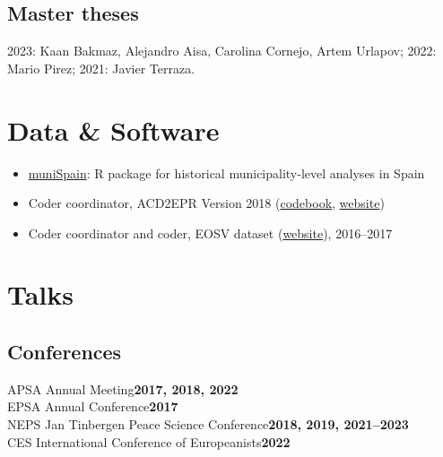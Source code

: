 \documentclass[a4paper, 12pt]{article}
\begin{document}
\subsection*{Master theses}

2023: Kaan Bakmaz, Alejandro Aisa, Carolina Cornejo, Artem Urlapov;
2022: Mario Pirez;
2021: Javier Terraza.

\section*{Data \& Software}

\begin{itemize}[leftmargin=*, nolistsep]
  \item \href{https://github.com/franvillamil/muniSpain}{muniSpain}: R package for historical municipality-level analyses in Spain
	\item Coder coordinator, ACD2EPR Version 2018 (\href{https://icr.ethz.ch/data/epr/acd2epr/ACD2EPR-2018_Codebook.pdf}{codebook,} \href{https://icr.ethz.ch/data/epr/acd2epr/}{website})
	\item Coder coordinator and coder, EOSV dataset (\href{https://snis.ch/project/civilian-victimization-conflict-escalation/}{website}), 2016--2017
\end{itemize}

\section*{Talks}

\subsection*{Conferences}

\noindent
APSA Annual Meeting\hfill\textbf{2017, 2018, 2022}\\
EPSA Annual Conference\hfill\textbf{2017}\\
NEPS Jan Tinbergen Peace Science Conference\hfill\textbf{2018, 2019, 2021--2023}\\
CES International Conference of Europeanists\hfill\textbf{2022}\\\vspace{15pt}


\vspace{-20pt}
\end{document}
